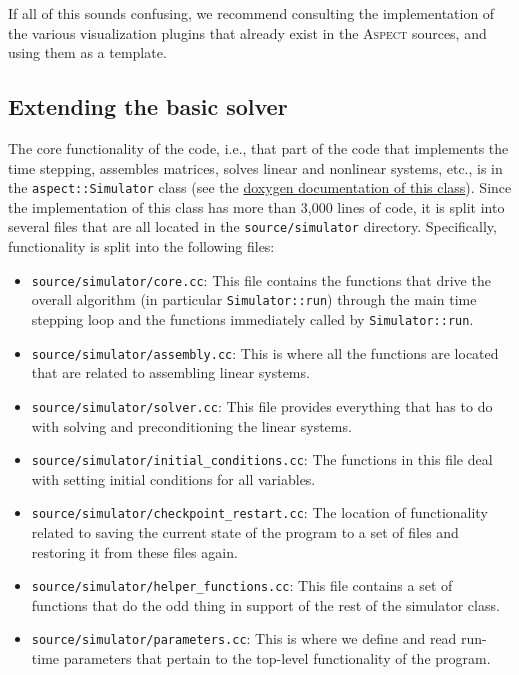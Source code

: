 \documentclass{article}
\newcommand{\aspect}{\textsc{Aspect}}
\begin{document}
If all of this sounds confusing, we recommend consulting the implementation of
the various visualization plugins that already exist in the \aspect{} sources,
and using them as a template.


\subsection{Extending the basic solver}
\label{sec:extending-solver}

The core functionality of the code, i.e., that part of the code that
implements the time stepping, assembles matrices, solves linear and nonlinear
systems, etc., is in the \texttt{aspect::Simulator} class (see the
\href{doc/doxygen/classaspect_1_1Simulator.html}{doxygen documentation of this
  class}). Since the implementation of this class has more than 3,000 lines of
code, it is split into several files that are all located in the
\texttt{source/simulator} directory. Specifically, functionality is split into
the following files:
\begin{itemize}
\item \texttt{source/simulator/core.cc}: This file contains the functions that
  drive the overall algorithm (in particular \texttt{Simulator::run}) through
  the main time stepping loop and the functions immediately called by
  \texttt{Simulator::run}.
\item \texttt{source/simulator/assembly.cc}: This is where all the functions
  are located that are related to assembling linear systems.
\item \texttt{source/simulator/solver.cc}: This file provides everything that
  has to do with solving and preconditioning the linear systems.
\item \texttt{source/simulator/initial\_conditions.cc}: The functions in this
  file deal with setting initial conditions for all variables.
\item \texttt{source/simulator/checkpoint\_restart.cc}: The location of
  functionality related to saving the current state of the program to a set of
  files and restoring it from these files again.
\item \texttt{source/simulator/helper\_functions.cc}: This file contains a set
  of functions that do the odd thing in support of the rest of the simulator
  class.
\item \texttt{source/simulator/parameters.cc}: This is where we define and
  read run-time parameters that pertain to the top-level functionality of the
  program.
\end{itemize}
\end{document}
